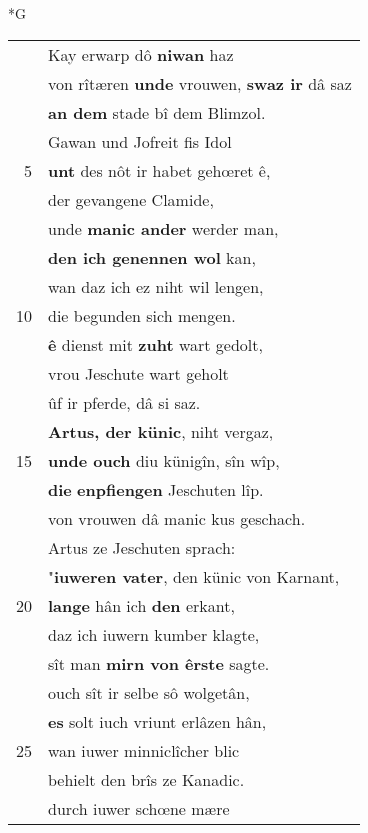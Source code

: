 \documentclass[8pt,a4paper,notitlepage]{article}
\begin{document}
\begin{table}[ht]
\begin{minipage}[t]{0.5\linewidth}
\end{minipage}
\end{table}
\newpage
\begin{table}[ht]
\begin{minipage}[t]{0.5\linewidth}
\small
\begin{center}*G
\end{center}
\begin{tabular}{rl}
 & Kay erwarp dô \textbf{niwan} haz\\ 
 & von rîtæren \textbf{unde} vrouwen, \textbf{swaz ir} dâ saz\\ 
 & \textbf{an dem} stade bî dem Blimzol.\\ 
 & Gawan und Jofreit fis Idol\\ 
5 & \textbf{unt} des nôt ir habet gehœret ê,\\ 
 & der gevangene Clamide,\\ 
 & unde \textbf{manic ander} werder man,\\ 
 & \textbf{den ich genennen wol} kan,\\ 
 & wan daz ich ez niht wil lengen,\\ 
10 & die begunden sich mengen.\\ 
 & \textbf{ê} dienst mit \textbf{zuht} wart gedolt,\\ 
 & vrou Jeschute wart geholt\\ 
 & ûf ir pferde, dâ si saz.\\ 
 & \textbf{Artus, der künic}, niht vergaz,\\ 
15 & \textbf{unde ouch} diu künigîn, sîn wîp,\\ 
 & \textbf{die} \textbf{enpfiengen} Jeschuten lîp.\\ 
 & von vrouwen dâ manic kus geschach.\\ 
 & Artus ze Jeschuten sprach:\\ 
 & "\textbf{iuweren vater}, den künic von Karnant,\\ 
20 & \textbf{lange} hân ich \textbf{den} erkant,\\ 
 & daz ich iuwern kumber klagte,\\ 
 & sît man \textbf{mirn von êrste} sagte.\\ 
 & ouch sît ir selbe sô wolgetân,\\ 
 & \textbf{es} solt iuch vriunt erlâzen hân,\\ 
25 & wan iuwer minniclîcher blic\\ 
 & behielt den brîs ze Kanadic.\\ 
 & durch iuwer schœne mære\\ 

\end{tabular}
\end{minipage}
\end{table}
\end{document}
